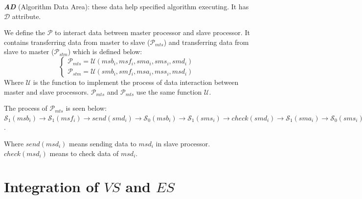 \documentclass[journal,UTF8]{IEEEtran}
\begin{document}
\textbf{\emph{AD}} (Algorithm Data Area): these data help specified algorithm executing. It has $\mathcal{D}$ attribute.
 
 We define the $\mathcal{P}$ to interact data between master processor and slave processor. It contains transferring data from master to slave ($\mathcal{P}_{mts}$) and transferring data from slave to master ($\mathcal{P}_{stm}$) which is defined below:
 \begin{equation}
 \left\{
 \begin{array}{l}
 \mathcal{P}_{mts} = \mathcal{U} (msb_i,msf_i,sma_i,sms_i,smd_i)\\
 \mathcal{P}_{stm} = \mathcal{U} (smb_i,smf_i,msa_i,mss_i,msd_i)
 \end{array}
 \right.
 \end{equation}
 Where $\mathcal{U}$ is the function to implement the process of data interaction between master and slave processors. $\mathcal{P}_{mts}$ and $\mathcal{P}_{mts}$ use the same function $\mathcal{U}$.
 
 The process of $\mathcal{P}_{mts}$ is seen below:
 	$\mathcal{S}_1(msb_i)\to\mathcal{S}_1(msf_i)\to send(smd_i)\to\mathcal{S}_0(msb_i)\to\mathcal{S}_1(sms_i)\to check(smd_i)\to\mathcal{S}_1(sma_i)\to\mathcal{S}_0(sms_i)\to\mathcal{S}_0(sma_i)\to\mathcal{S}_0(msf_i)$.
 
 Where $send(msd_i)$ means sending data to $msd_i$ in slave processor. $check(msd_i)$ means to check data of $msd_i$.

 

\section{Integration of $VS$ and $ES$}
\label{Integration}
\end{document}
